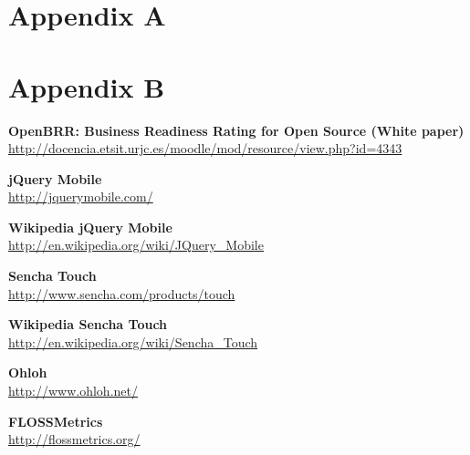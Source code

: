 \documentclass[a4paper,12pt]{book}
\begin{document}

\appendix
\chapter{Appendix A}
\label{app:appenda}


\appendix
\chapter{Appendix B}
\label{app:appendb}


\begin{thebibliography}{25}
 

\textbf{OpenBRR: Business Readiness Rating for
Open Source (White paper)}\\
{\footnotesize\url{
http://docencia.etsit.urjc.es/moodle/mod/resource/view.php?id=4343}}

\textbf{jQuery Mobile}\\
{\footnotesize\url{http://jquerymobile.com/}}

\textbf{Wikipedia jQuery Mobile}\\
{\footnotesize\url{http://en.wikipedia.org/wiki/JQuery_Mobile}}

\textbf{Sencha Touch}\\
{\footnotesize\url{http://www.sencha.com/products/touch}}

\textbf{Wikipedia Sencha Touch}\\
{\footnotesize\url{http://en.wikipedia.org/wiki/Sencha_Touch}}

\textbf{Ohloh}\\
{\footnotesize\url{http://www.ohloh.net/}}

\textbf{FLOSSMetrics}\\
{\footnotesize\url{http://flossmetrics.org/}}

%

\end{thebibliography}
\end{document}
